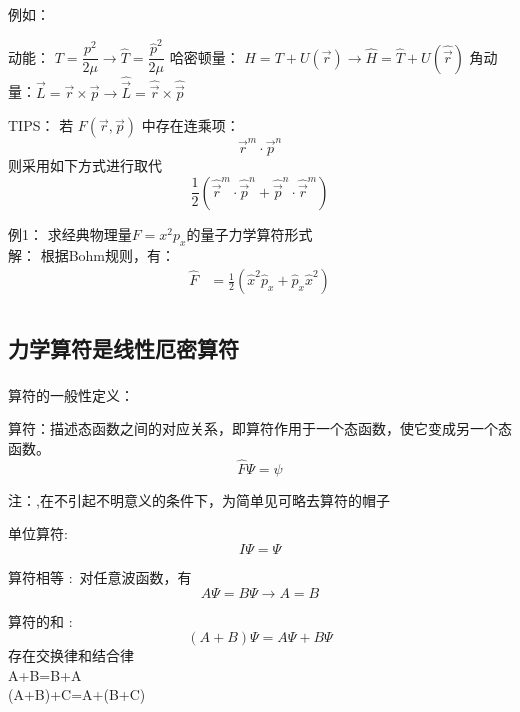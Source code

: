 \begin{frame}    
    \begin{exampleblock}{例如：}
        \begin{itemize}
            \Item  动能： $ T=\dfrac{p^2}{2\mu} \to \hat{T}= \dfrac{\hat{p}^2}{2\mu} $
            \Item  哈密顿量： $ H=T+U(\vec{r} ) \to \hat{H}= \hat{T}+ U(\hat{\vec{r}})$
            \Item  角动量：$ \vec{L}=\vec{r}\times\vec{p} \to \hat{\vec{L}}=\hat{\vec{r}}\times \hat{\vec{p}}$
        \end{itemize}
    \end{exampleblock}  
    \alert{TIPS：} 若 $F(\vec{r},\vec{p})$ 中存在连乘项： 
    \[\vec{r}^m\cdot\vec{p}^n\] 
    则采用如下方式进行取代
    \[\frac{1}{2}(\hat{\vec{r}}^m\cdot\hat{\vec{p}}^n+\hat{\vec{p}}^n\cdot\hat{\vec{r}}^m)\]
\end{frame} 

\begin{frame} 
    \alert{例1：} 求经典物理量$F=x^2p_x$的量子力学算符形式 \\ 
    \alert{解：} 根据Bohm规则，有：
    \[\begin{aligned}
        \hat{F}&=\frac{1}{2} (\hat{x}^2 \hat{p}_x + \hat{p}_x \hat{x}^2 ) \\
    \end{aligned}\]   
\end{frame}     

\subsection{力学算符是线性厄密算符}

\begin{frame} 
    \frametitle{}
    算符的一般性定义：
    \begin{definition}
        算符：描述态函数之间的对应关系，即算符作用于一个态函数，使它变成另一个态函数。
        $$ \hat{F} \Psi=\psi$$
    \end{definition}
    注：,在不引起不明意义的条件下，为简单见可略去算符的帽子
    \begin{definition}
        单位算符:
        $$ I\Psi=\Psi $$
    \end{definition}
\end{frame} 

\begin{frame}
    \begin{definition}
        算符相等 : 对任意波函数，有
        $$ A\Psi=B\Psi \to A=B $$
    \end{definition}
    \begin{definition}
        算符的和 : 
        $$ (A+B)\Psi=A\Psi+B\Psi $$
        存在交换律和结合律\\
        A+B=B+A\\
        (A+B)+C=A+(B+C)
    \end{definition}
\end{frame} 

